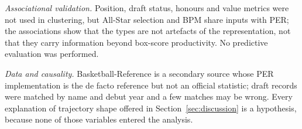 \emph{Associational validation.} Position, draft status, honours and value metrics were not used in clustering, but All-Star selection and BPM share inputs with PER; the associations show that the types are not artefacts of the representation, not that they carry information beyond box-score productivity. No predictive evaluation was performed.

\emph{Data and causality.} Basketball-Reference is a secondary source whose PER implementation is the de facto reference but not an official statistic; draft records were matched by name and debut year and a few matches may be wrong. Every explanation of trajectory shape offered in Section~\ref{sec:discussion} is a hypothesis, because none of those variables entered the analysis.
